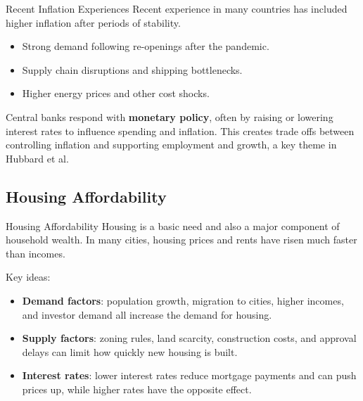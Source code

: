 \documentclass[aspectratio=169]{beamer}
\begin{document}
\begin{frame}{Recent Inflation Experiences}
  \transfade
  Recent experience in many countries has included higher inflation after periods of stability.

  \begin{itemize}
    \item Strong demand following re-openings after the pandemic.
    \item Supply chain disruptions and shipping bottlenecks.
    \item Higher energy prices and other cost shocks.
  \end{itemize}

  \vspace{0.3cm}
  Central banks respond with \textbf{monetary policy}, often by raising or lowering interest rates
  to influence spending and inflation. This creates trade offs between controlling inflation and
  supporting employment and growth, a key theme in Hubbard et al.
\end{frame}

\subsection{Housing Affordability}

\begin{frame}{Housing Affordability}
  \transfade
  Housing is a basic need and also a major component of household wealth. In many cities,
  housing prices and rents have risen much faster than incomes.

  \vspace{0.2cm}
  Key ideas:
  \begin{itemize}
    \item \textbf{Demand factors}: population growth, migration to cities, higher incomes, and investor
    demand all increase the demand for housing.
    \item \textbf{Supply factors}: zoning rules, land scarcity, construction costs, and approval delays
    can limit how quickly new housing is built.
    \item \textbf{Interest rates}: lower interest rates reduce mortgage payments and can push prices
    up, while higher rates have the opposite effect.
  \end{itemize}
\end{frame}
\end{document}
